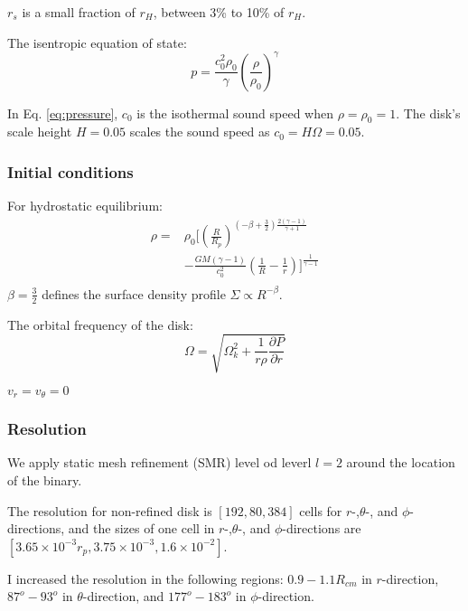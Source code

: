 \documentclass[twocolumn]{aastex631}
\begin{document}
$r_s$ is a small fraction of $r_H$, between 3\% to 10\% of $r_H$.

The isentropic equation of state:
\begin{equation}\label{eq:pressure}
    p = \frac{c_0^2\rho_0}{\gamma}\left(\frac{\rho}{\rho_0}\right)^\gamma
\end{equation}

In Eq. \ref{eq:pressure}, $c_0$ is the isothermal sound speed when $\rho=\rho_0=1$. 
The disk's scale height $H = 0.05$ scales the sound speed as $c_0 = H\Omega=0.05$.

\subsubsection{Initial conditions}
For hydrostatic equilibrium:
\begin{equation}\label{eq:density}
\begin{aligned}
     \rho = & \rho_0 \bigg[\left(\frac{R}{R_p}\right)^{(-\beta+\frac{3}{2})\frac{2(\gamma-1)}{\gamma+1}} \\ 
    & - \frac{GM(\gamma-1)}{c_0^2}\left(\frac{1}{R}-\frac{1}{r}\right)\bigg]^{\frac{1}{\gamma-1}} \\
\end{aligned}
\end{equation}
$\beta=\frac{3}{2}$ defines the surface density profile $\Sigma\propto R^{-\beta}$.

The orbital frequency of the disk:
\begin{equation}\label{eq:omegadisk}
    \Omega = \sqrt{\Omega_k^2+\frac{1}{r\rho}\frac{\partial P}{\partial r}}
\end{equation}

$v_r=v_\theta=0$


\subsubsection{Resolution}
We apply static mesh refinement (SMR) level od leverl $l=2$ around the location of the binary.

The resolution for non-refined disk is $[192,80,384]$ cells for $r$-,$\theta$-, and $\phi$-directions, and the sizes of one cell in $r$-,$\theta$-, and $\phi$-directions are $[3.65\times 10^{-3}r_p, 3.75\times 10^{-3}, 1.6\times 10^{-2}]$. 

I increased the resolution in the following regions: $0.9-1.1 R_{cm}$ in $r$-direction, $87^o-93^o$ in $\theta$-direction, and $177^o-183^o$ in $\phi$-direction. 
\end{document}
